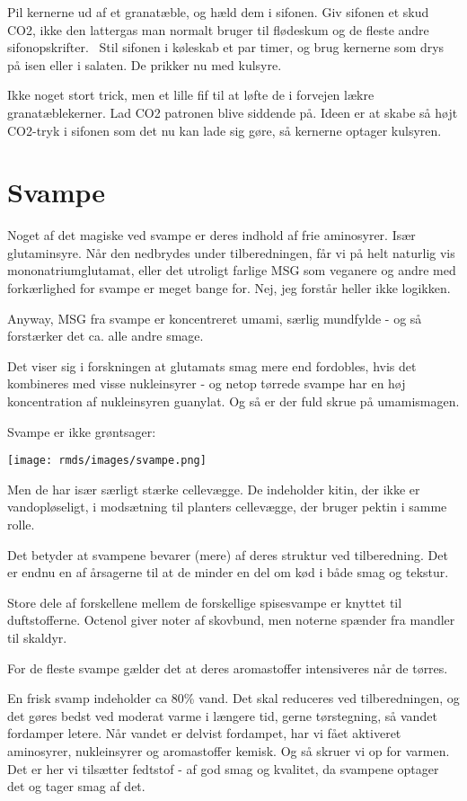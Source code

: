 \documentclass[
  letterpaper,
  DIV=11,
  numbers=noendperiod]{scrreprt}
\begin{document}
Pil kernerne ud af et granatæble, og hæld dem i sifonen. Giv sifonen et
skud CO2, ikke den lattergas man normalt bruger til flødeskum og de
fleste andre sifonopskrifter.~ Stil sifonen i køleskab et par timer, og
brug kernerne som drys på isen eller i salaten. De prikker nu med
kulsyre.

Ikke noget stort trick, men et lille fif til at løfte de i forvejen
lækre granatæblekerner. Lad CO2 patronen blive siddende på. Ideen er at
skabe så højt CO2-tryk i sifonen som det nu kan lade sig gøre, så
kernerne optager kulsyren.

\hypertarget{svampe}{%
\section{Svampe}\label{svampe}}

Noget af det magiske ved svampe er deres indhold af frie aminosyrer.
Især glutaminsyre. Når den nedbrydes under tilberedningen, får vi på
helt naturlig vis mononatriumglutamat, eller det utroligt farlige MSG
som veganere og andre med forkærlighed for svampe er meget bange for.
Nej, jeg forstår heller ikke logikken.

Anyway, MSG fra svampe er koncentreret umami, særlig mundfylde - og så
forstærker det ca. alle andre smage.

Det viser sig i forskningen at glutamats smag mere end fordobles, hvis
det kombineres med visse nukleinsyrer - og netop tørrede svampe har en
høj koncentration af nukleinsyren guanylat. Og så er der fuld skrue på
umamismagen.

Svampe er ikke grøntsager:

\texttt{[image: rmds/images/svampe.png]}

Men de har især særligt stærke cellevægge. De indeholder kitin, der ikke
er vandopløseligt, i modsætning til planters cellevægge, der bruger
pektin i samme rolle.

Det betyder at svampene bevarer (mere) af deres struktur ved
tilberedning. Det er endnu en af årsagerne til at de minder en del om
kød i både smag og tekstur.

Store dele af forskellene mellem de forskellige spisesvampe er knyttet
til duftstofferne. Octenol giver noter af skovbund, men noterne spænder
fra mandler til skaldyr.

For de fleste svampe gælder det at deres aromastoffer intensiveres når
de tørres.

En frisk svamp indeholder ca 80\% vand. Det skal reduceres ved
tilberedningen, og det gøres bedst ved moderat varme i længere tid,
gerne tørstegning, så vandet fordamper letere. Når vandet er delvist
fordampet, har vi fået aktiveret aminosyrer, nukleinsyrer og
aromastoffer kemisk. Og så skruer vi op for varmen. Det er her vi
tilsætter fedtstof - af god smag og kvalitet, da svampene optager det og
tager smag af det.
\end{document}

